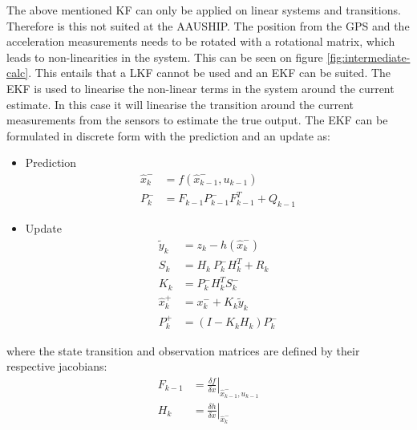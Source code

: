 The above mentioned \ac{KF} can only be applied on linear systems and transitions. Therefore is this not suited at the AAUSHIP. The position from the \ac{GPS} and the acceleration measurements needs to be rotated with a rotational matrix, which leads to non-linearities in the system. This can be seen on figure \vref{fig:intermediate-calc}. This entails that a \ac{LKF} cannot be used and an \ac{EKF} can be suited. The \ac{EKF} is used to linearise the non-linear terms in the system around the current estimate. In this case it will linearise the transition around the current measurements from the sensors to estimate the true output. The \ac{EKF} can be formulated in discrete form with the prediction and an update as:
\begin{itemize}
\item Prediction
\begin{align}
\hat x_k^- &= f(\hat x_{k-1}^-,u_{k-1})\\
P_k^- &= F_{k-1}P_{k-1}^-F_{k-1}^T+Q_{k-1}
\end{align}

\item Update
\begin{align}
\tilde y_k &= z_k - h(\hat x_k^-)\\
S_k &= H_k\ P_k^-H_k^T + R_k\\
K_k &= P_k^-H_k^TS_k^-\\
\hat x_k^+ &= x_k^- + K_k \tilde y_k\\
P_k^+ &= (I - K_k H_k) P_k^-
\end{align}
\end{itemize}
where the state transition and observation matrices are defined by their respective jacobians:
\begin{align}
F_{k-1} &= \left.\frac{\delta f}{\delta x}\right|_{\hat x_{k-1}^-,u_{k-1}}\\
H_k &= \left.\frac{\delta h}{\delta x}\right|_{\hat x_{k}^-}
\end{align}
